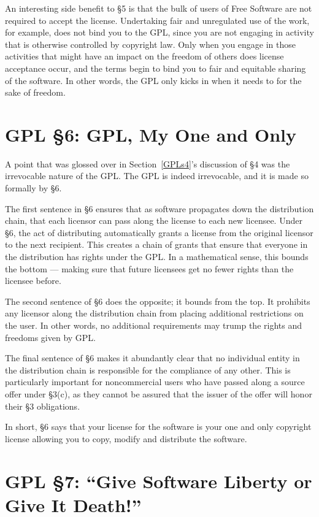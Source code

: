 \documentclass[11pt, letterpaper]{book}
\begin{document}
An interesting side benefit to \S 5 is that the bulk of users of Free
Software are not required to accept the license. Undertaking fair and
unregulated use of the work, for example, does not bind you to the GPL,
since you are not engaging in activity that is otherwise controlled by
copyright law. Only when you engage in those activities that might have an
impact on the freedom of others does license acceptance occur, and the
terms begin to bind you to fair and equitable sharing of the software. In
other words, the GPL only kicks in when it needs to for the sake of
freedom.

\section{GPL \S 6: GPL, My One and Only}
\label{GPLs6}

A point that was glossed over in Section~\ref{GPLs4}'s discussion of \S 4
was the irrevocable nature of the GPL\@. The GPL is indeed irrevocable,
and it is made so formally by \S 6.

The first sentence in \S 6 ensures that as software propagates down the
distribution chain, that each licensor can pass along the license to each
new licensee. Under \S 6, the act of distributing automatically grants a
license from the original licensor to the next recipient. This creates a
chain of grants that ensure that everyone in the distribution has rights
under the GPL\@. In a mathematical sense, this bounds the bottom ---
making sure that future licensees get no fewer rights than the licensee before.

The second sentence of \S 6 does the opposite; it bounds from the top. It
prohibits any licensor along the distribution chain from placing
additional restrictions on the user. In other words, no additional
requirements may trump the rights and freedoms given by GPL\@.

The final sentence of \S 6 makes it abundantly clear that no individual
entity in the distribution chain is responsible for the compliance of any
other. This is particularly important for noncommercial users who have
passed along a source offer under \S 3(c), as they cannot be assured that
the issuer of the offer will honor their \S 3 obligations.

In short, \S 6 says that your license for the software is your one and
only copyright license allowing you to copy, modify and distribute the
software.

\section{GPL \S 7: ``Give Software Liberty or Give It Death!''}
\label{GPLs7}
\end{document}
